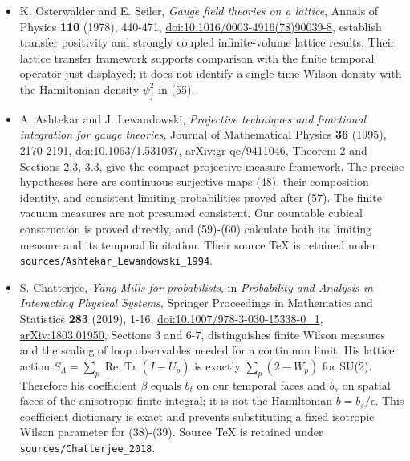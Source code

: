 \documentclass[
  11pt,
]{article}
\begin{document}
\begin{itemize}
\item
  K. Osterwalder and E. Seiler, \emph{Gauge field theories on a
  lattice}, Annals of Physics \textbf{110} (1978), 440-471,
  \href{https://doi.org/10.1016/0003-4916(78)90039-8}{doi:10.1016/0003-4916(78)90039-8},
  establish transfer positivity and strongly coupled infinite-volume
  lattice results. Their lattice transfer framework supports comparison
  with the finite temporal operator just displayed; it does not identify
  a single-time Wilson density with the Hamiltonian density \(\psi_j^2\)
  in (55).
\item
  A. Ashtekar and J. Lewandowski, \emph{Projective techniques and
  functional integration for gauge theories}, Journal of Mathematical
  Physics \textbf{36} (1995), 2170-2191,
  \href{https://doi.org/10.1063/1.531037}{doi:10.1063/1.531037},
  \href{https://arxiv.org/abs/gr-qc/9411046}{arXiv:gr-qc/9411046},
  Theorem 2 and Sections 2.3, 3.3, give the compact projective-measure
  framework. The precise hypotheses here are continuous surjective maps
  (48), their composition identity, and consistent limiting
  probabilities proved after (57). The finite vacuum measures are not
  presumed consistent. Our countable cubical construction is proved
  directly, and (59)-(60) calculate both its limiting measure and its
  temporal limitation. Their source TeX is retained under
  \texttt{sources/Ashtekar\_Lewandowski\_1994}.
\item
  S. Chatterjee, \emph{Yang-Mills for probabilists}, in
  \emph{Probability and Analysis in Interacting Physical Systems},
  Springer Proceedings in Mathematics and Statistics \textbf{283}
  (2019), 1-16,
  \href{https://doi.org/10.1007/978-3-030-15338-0_1}{doi:10.1007/978-3-030-15338-0\_1},
  \href{https://arxiv.org/abs/1803.01950}{arXiv:1803.01950}, Sections 3
  and 6-7, distinguishes finite Wilson measures and the scaling of loop
  observables needed for a continuum limit. His lattice action
  \(S_\Lambda=\sum_p\operatorname{Re}\operatorname{Tr}(I-U_p)\) is
  exactly \(\sum_p(2-W_p)\) for SU(2). Therefore his coefficient
  \(\beta\) equals \(b_t\) on our temporal faces and \(b_s\) on spatial
  faces of the anisotropic finite integral; it is not the Hamiltonian
  \(b=b_s/\epsilon\). This coefficient dictionary is exact and prevents
  substituting a fixed isotropic Wilson parameter for (38)-(39). Source
  TeX is retained under \texttt{sources/Chatterjee\_2018}.
\end{itemize}
\end{document}
